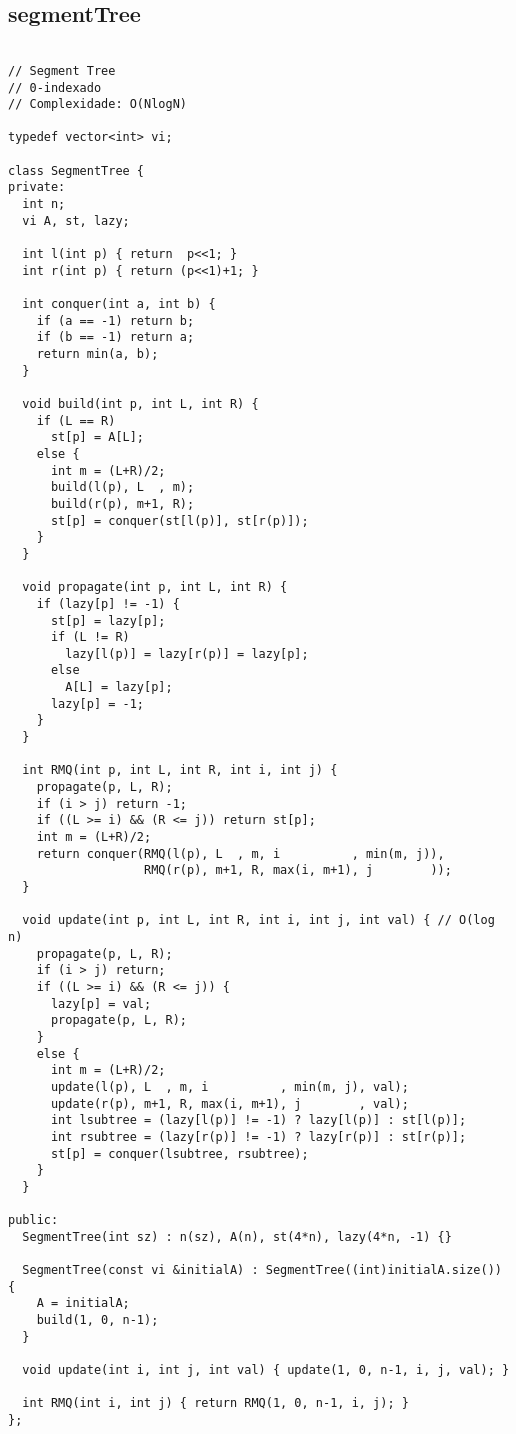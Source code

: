 \documentclass[landscape,twocolumn,10pt,a4paper]{article}
\begin{document}
\subsection{segmentTree}
\begin{verbatim}

// Segment Tree
// 0-indexado
// Complexidade: O(NlogN)

typedef vector<int> vi;

class SegmentTree {
private:
  int n;
  vi A, st, lazy;

  int l(int p) { return  p<<1; }
  int r(int p) { return (p<<1)+1; }

  int conquer(int a, int b) {
    if (a == -1) return b;
    if (b == -1) return a;
    return min(a, b);
  }

  void build(int p, int L, int R) {
    if (L == R)
      st[p] = A[L];
    else {
      int m = (L+R)/2;
      build(l(p), L  , m);
      build(r(p), m+1, R);
      st[p] = conquer(st[l(p)], st[r(p)]);
    }
  }

  void propagate(int p, int L, int R) {
    if (lazy[p] != -1) {
      st[p] = lazy[p];
      if (L != R)
        lazy[l(p)] = lazy[r(p)] = lazy[p];
      else
        A[L] = lazy[p];
      lazy[p] = -1;
    }
  }

  int RMQ(int p, int L, int R, int i, int j) {
    propagate(p, L, R);
    if (i > j) return -1;
    if ((L >= i) && (R <= j)) return st[p];
    int m = (L+R)/2;
    return conquer(RMQ(l(p), L  , m, i          , min(m, j)),
                   RMQ(r(p), m+1, R, max(i, m+1), j        ));
  }

  void update(int p, int L, int R, int i, int j, int val) { // O(log n)
    propagate(p, L, R);
    if (i > j) return;
    if ((L >= i) && (R <= j)) {
      lazy[p] = val;
      propagate(p, L, R);
    }
    else {
      int m = (L+R)/2;
      update(l(p), L  , m, i          , min(m, j), val);
      update(r(p), m+1, R, max(i, m+1), j        , val);
      int lsubtree = (lazy[l(p)] != -1) ? lazy[l(p)] : st[l(p)];
      int rsubtree = (lazy[r(p)] != -1) ? lazy[r(p)] : st[r(p)];
      st[p] = conquer(lsubtree, rsubtree);
    }
  }

public:
  SegmentTree(int sz) : n(sz), A(n), st(4*n), lazy(4*n, -1) {}

  SegmentTree(const vi &initialA) : SegmentTree((int)initialA.size()) {
    A = initialA;
    build(1, 0, n-1);
  }

  void update(int i, int j, int val) { update(1, 0, n-1, i, j, val); }

  int RMQ(int i, int j) { return RMQ(1, 0, n-1, i, j); }
};



\end{verbatim}
\end{document}
